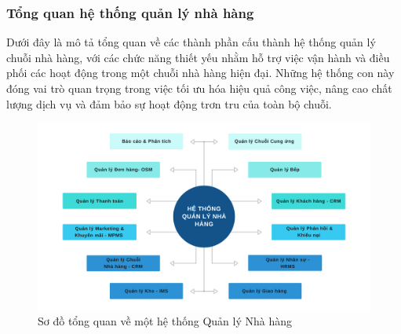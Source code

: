

\subsubsection{Tổng quan hệ thống quản lý nhà hàng}

Dưới đây là mô tả tổng quan về các thành phần cấu thành hệ thống quản lý chuỗi nhà hàng, với các chức năng thiết yếu nhằm hỗ trợ việc vận hành và điều phối các hoạt động trong một chuỗi nhà hàng hiện đại. Những hệ thống con này đóng vai trò quan trọng trong việc tối ưu hóa hiệu quả công việc, nâng cao chất lượng dịch vụ và đảm bảo sự hoạt động trơn tru của toàn bộ chuỗi.

\begin{figure}[H]
	\centering
	\includegraphics[width=15cm]{Images/so-do-he-thong.png}
	\vspace{0.5cm}
	\caption{Sơ đồ tổng quan về một hệ thống Quản lý Nhà hàng}
	\label{fig:my_label}
\end{figure}

